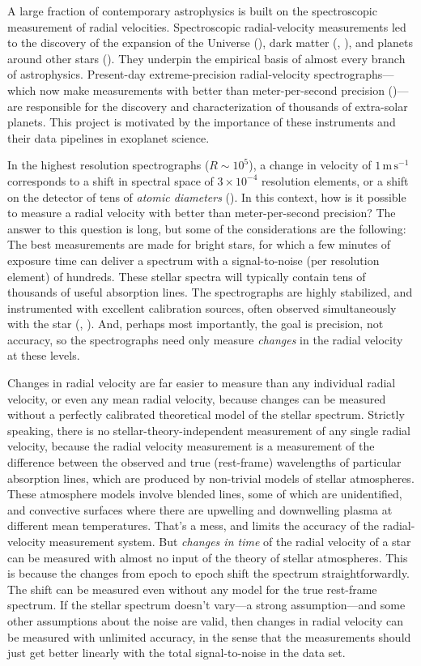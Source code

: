 \documentclass[modern]{aastex631}
\newcommand{\unit}[1]{\mathrm{#1}}
\newcommand{\m}{\unit{m}}
\newcommand{\s}{\unit{s}}
\newcommand{\mps}{\m\,\s^{-1}}
\begin{document}
A large fraction of contemporary astrophysics is built on the spectroscopic measurement of radial velocities.
Spectroscopic radial-velocity measurements led to the discovery of the expansion of the Universe (\citealt{hubble}),
dark matter (\citealt{zwicky}, \citealt{rubin}),
and planets around other stars (\citealt{mayor}).
They underpin the empirical basis of almost every branch of astrophysics.
Present-day extreme-precision radial-velocity spectrographs---which now make measurements with better than meter-per-second precision (\citealt{what?})---are responsible for the discovery and characterization of thousands of extra-solar planets.
This project is motivated by the importance of these instruments and their data pipelines in exoplanet science.

In the highest resolution spectrographs ($R\sim 10^5$), a change in velocity of $1\,\mps$ corresponds to a shift in spectral space of $3\times 10^{-4}$ resolution elements, or a shift on the detector of tens of \emph{atomic diameters} (\citealt{zhaophd}).
In this context, how is it possible to measure a radial velocity with better than meter-per-second precision?
The answer to this question is long, but some of the considerations are the following:
The best measurements are made for bright stars, for which a few minutes of exposure time can deliver a spectrum with a signal-to-noise (per resolution element) of hundreds.
These stellar spectra will typically contain tens of thousands of useful absorption lines.
The spectrographs are highly stabilized, and instrumented with excellent calibration sources, often observed simultaneously with the star (\citep{simultaneousreference}, \citep{gascell}).
And, perhaps most importantly, the goal is precision, not accuracy, so the spectrographs need only measure \emph{changes} in the radial velocity at these levels.

Changes in radial velocity are far easier to measure than any individual radial velocity, or even any mean radial velocity, because changes can be measured without a perfectly calibrated theoretical model of the stellar spectrum.
Strictly speaking, there is no stellar-theory-independent measurement of any single radial velocity, because the radial velocity measurement is a measurement of the difference between the observed and true (rest-frame) wavelengths of particular absorption lines, which are produced by non-trivial models of stellar atmospheres.
These atmosphere models involve blended lines, some of which are unidentified, and convective surfaces where there are upwelling and downwelling plasma at different mean temperatures.
That's a mess, and limits the accuracy of the radial-velocity measurement system.
But \emph{changes in time} of the radial velocity of a star can be measured with almost no input of the theory of stellar atmospheres.
This is because the changes from epoch to epoch shift the spectrum straightforwardly.
The shift can be measured even without any model for the true rest-frame spectrum.
If the stellar spectrum doesn't vary---a strong assumption---and some other assumptions about the noise are valid, then changes in radial velocity can be measured with unlimited accuracy, in the sense that the measurements should just get better linearly with the total signal-to-noise in the data set.
\end{document}
